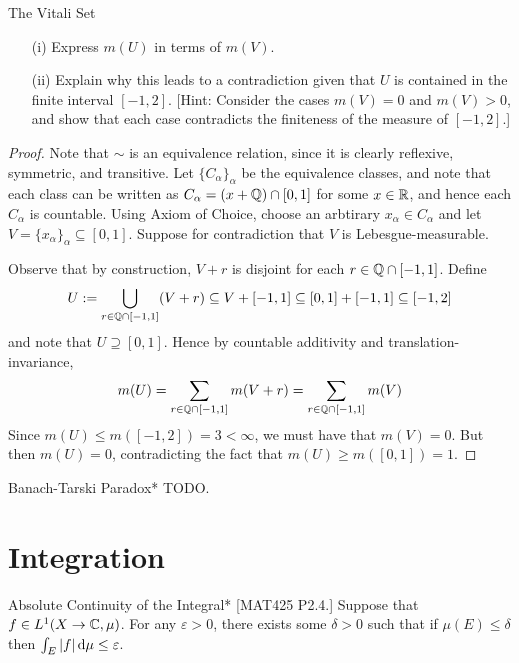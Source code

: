 \begin{problem}{The Vitali Set}
\begin{enumerate}[(a)]
        \begin{itemize}
            \item[(i)] Express \(m(U)\) in terms of \(m(V)\).
            \item[(ii)] Explain why this leads to a contradiction given that \(U\) is contained in the finite interval \([-1,2]\). [Hint: Consider the cases \(m(V) = 0\) and \(m(V) > 0\), and show that each case contradicts the finiteness of the measure of \([-1,2]\).]
        \end{itemize}
    \end{enumerate}
\end{problem}

\begin{proof}
    Note that \(\sim\) is an equivalence relation, since it is clearly reflexive, symmetric, and transitive. Let \(\{C_\alpha\}_\alpha\) be the equivalence classes, and note that each class can be written as \(C_\alpha = (x + \mathbb{Q}) \cap [0,1]\) for some \(x \in \mathbb{R}\), and hence each \(C_\alpha\) is countable. Using Axiom of Choice, choose an arbtirary \(x_\alpha \in C_\alpha\) and let \(V = \{x_\alpha\}_\alpha \subseteq [0,1]\). Suppose for contradiction that \(V\) is Lebesgue-measurable. 
    \stdvspace

    Observe that by construction, \(V+r\) is disjoint for each \(r \in \mathbb{Q} \cap [-1, 1]\). Define 
    \[
        U := \bigcup_{r \in \mathbb{Q} \cap [-1, 1]} (V + r) \subseteq V + [-1, 1] \subseteq [0,1] + [-1,1] \subseteq [-1, 2]
    \]
    and note that \(U \supseteq [0,1]\). Hence by countable additivity and translation-invariance, 
    \[
        m(U) = \sum_{r \in \mathbb{Q} \cap [-1,1]} m(V+r) = \sum_{r \in \mathbb{Q} \cap [-1,1]} m(V)
    \]
    Since \(m(U) \leq m([-1,2]) = 3 < \infty\), we must have that \(m(V) = 0\). But then \(m(U) = 0\), contradicting the fact that \(m(U) \geq m([0,1]) = 1\). 
\end{proof}

\begin{problem}{Banach-Tarski Paradox}*
    TODO.
\end{problem}

\newpage
\section{Integration}

\begin{problem}{Absolute Continuity of the Integral}*
    [MAT425 P2.4.] Suppose that \(f \in L^1(X \to \mathbb{C}, \mu)\). For any \(\varepsilon > 0\), there exists some \(\delta > 0\) such that if \(\mu(E) \leq \delta\) then \(\int_E |f| \, \mathrm{d}\mu \leq \varepsilon\). 
\end{problem}


